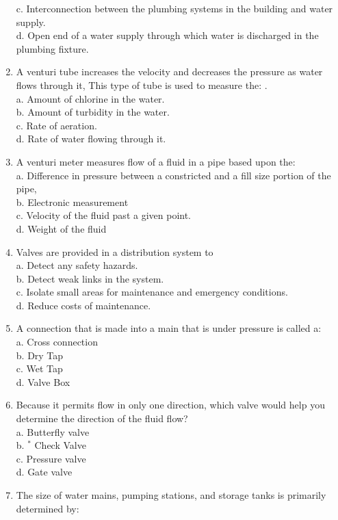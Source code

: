 \begin{enumerate}[1.]
c. Interconnection between the plumbing systems in the building and water supply.\\
d. Open end of a water supply through which water is discharged in the plumbing fixture.\\
\item A venturi tube increases the velocity and decreases the pressure as water flows through it, This type of tube is used to measure the: .\\
a. Amount of chlorine in the water.\\
b. Amount of turbidity in the water.\\
c. Rate of aeration.\\
d. Rate of water flowing through it.\\
\item A venturi meter measures flow of a fluid in a pipe based upon the:\\
a. Difference in pressure between a constricted and a fill size portion of the pipe,\\
b. Electronic measurement\\
c. Velocity of the fluid past a given point.\\
d. Weight of the fluid\\
\item Valves are provided in a distribution system to\\
a. Detect any safety hazards.\\
b. Detect weak links in the system.\\
c. Isolate small areas for maintenance and emergency conditions.\\
d. Reduce costs of maintenance.\\
\item A connection that is made into a main that is under pressure is called a:\\
a. Cross connection\\
b. Dry Tap\\
c. Wet Tap\\
d. Valve Box\\
\item Because it permits flow in only one direction, which valve would help you determine the direction of the fluid flow?\\
a. Butterfly valve\\
b. ${ }^{*}$ Check Valve\\
c. Pressure valve\\
d. Gate valve\\
\item The size of water mains, pumping stations, and storage tanks is primarily determined by:\\

\end{enumerate}
